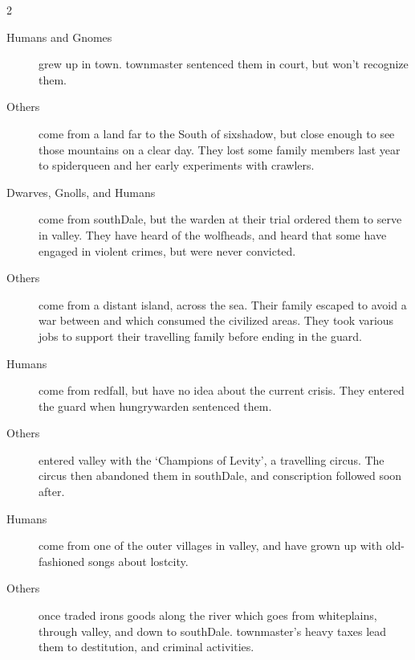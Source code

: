 \begin{multicols}{2}
\begin{dlist}
  \item
  \begin{description}
    \item[Humans and Gnomes]
  grew up in \gls{town}.
  \Gls{townmaster} sentenced them in \gls{court}, but won't recognize them.
    \item[Others]
    come from a land far to the South of \gls{sixshadow}, but close enough to see those mountains on a clear day.
    They lost some family members last year to \gls{spiderqueen} and her early experiments with \glspl{crawler}.
  \end{description}
  \item
  \begin{description}
    \item[Dwarves, Gnolls, and Humans]
    come from \gls{southDale}, but the \gls{warden} at their trial ordered them to serve in \gls{valley}.
    They have heard of the \glspl{wolfhead}, and heard that some have engaged in violent crimes, but were never convicted.
    \item[Others]
    come from a distant island, across the sea.
    Their family escaped to avoid a war between  and  which consumed the civilized areas.
    They took various jobs to support their travelling family before ending in the \gls{guard}.
  \end{description}
  \item
  \begin{description}
    \item[Humans]
    come from \gls{redfall}, but have no idea about the current crisis.
    They entered the \gls{guard} when \gls{hungrywarden} sentenced them.
    \item[Others]
    entered \gls{valley} with the `Champions of Levity', a travelling circus.
    The circus then abandoned them in \gls{southDale}, and conscription followed soon after.
  \end{description}
  \item
  \begin{description}
    \item[Humans]
    come from one of the outer \glspl{village} in \gls{valley}, and have grown up with old-fashioned songs about \gls{lostcity}.
    \item[Others]
    once traded irons goods along the river which goes from \gls{whiteplains}, through \gls{valley}, and down to \gls{southDale}.
    \Gls{townmaster}'s heavy taxes lead them to destitution, and criminal activities.

\end{description}
\end{dlist}
\end{multicols}
